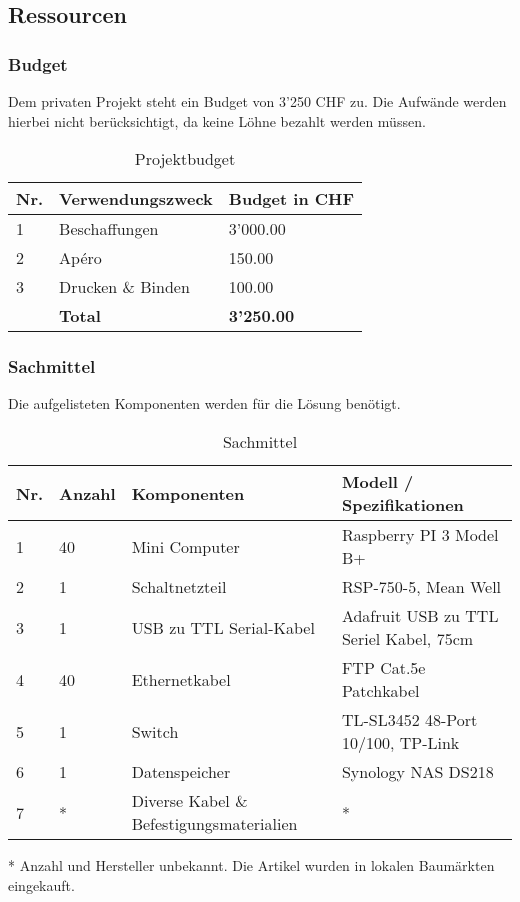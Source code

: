 \subsection{Ressourcen}

\subsubsection{Budget}
Dem privaten Projekt steht ein Budget von 3'250 CHF zu. Die Aufwände werden hierbei nicht berücksichtigt, da keine Löhne bezahlt werden müssen.
\begin{table}[H]
\centering
\begin{tabular}[t]{p{1cm}p{10cm}p{5cm}}
\hline
\rowcolor{heading}\textbf{Nr.} & \textbf{Verwendungszweck} &\hfill \textbf{Budget in CHF} \\\hline
1 & Beschaffungen & \hfill 3'000.00 \\\hline
2 & Apéro & \hfill 150.00 \\\hline
3 & Drucken \& Binden &\hfill 100.00 \\\hline
\textbf{} & \textbf{Total} &\hfill \textbf{3'250.00}  \\\hline
\end{tabular}
\caption{Projektbudget}
\end{table}

\subsubsection{Sachmittel}
Die aufgelisteten Komponenten werden für die Lösung benötigt.

\begin{table}[H]
\centering
\begin{tabular}[t]{p{1cm}p{1.2cm}p{6.9cm}p{6.9cm}}
\hline
\rowcolor{heading}\textbf{Nr.} & \textbf{Anzahl} & \textbf{Komponenten} & \textbf{Modell / Spezifikationen}\\\hline
1 & 40 & Mini Computer & Raspberry PI 3 Model B+\\\hline
2 & 1 & Schaltnetzteil & RSP-750-5, Mean Well\\\hline
3 & 1 & USB zu TTL Serial-Kabel & Adafruit USB zu TTL Seriel Kabel, 75cm \\\hline
4 & 40 & Ethernetkabel & FTP Cat.5e Patchkabel \\\hline
5 & 1 & Switch & TL-SL3452 48-Port 10/100, TP-Link \\\hline
6 & 1 & Datenspeicher & Synology NAS DS218\\\hline
7 & * & Diverse Kabel \& Befestigungsmaterialien & *\\\hline
\end{tabular}
\caption{Sachmittel}
\end{table}
* Anzahl und Hersteller unbekannt. Die Artikel wurden in lokalen Baumärkten eingekauft.